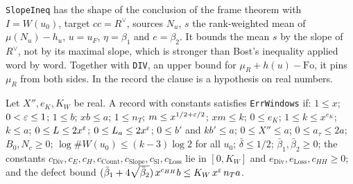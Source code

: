 \begin{remark}\label{geoa:rem-slopeineq}
\texttt{SlopeIneq} has the shape of the conclusion of the frame theorem with $I=W(u_0)$,
target $cc=R^{\vee}$, sources $N_u$, $s$ the rank-weighted mean of $\mu(N_u)-h_u$,
$u=u_F$, $\eta=\beta_1$ and $e=\beta_2$. It bounds the mean $s$ by the slope of
$R^{\vee}$, not by its maximal slope, which is stronger than Bost's inequality applied word
by word. Together with \texttt{DIV}, an upper bound for $\mu_R+h(u)-\mathrm{Fo}$, it
pins $\mu_R$ from both sides. In the record the clause is a hypothesis on real numbers.
\end{remark}

\begin{definition}\label{geoa:errwindows}
Let $X'',e_K,K_W$ be real. A record with constants satisfies \texttt{ErrWindows} if:
$1\le x$; $0<\varepsilon\le1$; $1\le b$; $xb\le a$; $1\le n_T$; $m\le x^{1/2+\varepsilon/2}$;
$xm\le k$; $0\le e_K$; $1\le k\le x^{e_K}$; $k\le a$; $0\le L\le2x^{\varepsilon}$;
$0\le L_a\le2x^{\varepsilon}$; $0\le b'$ and $kb'\le a$; $0\le X''\le a$; $0\le a_{\tau}\le2a$;
$B_0,N_c\ge0$; $\log\#W(u_0)\le(k-3)\log2$ for all $u_0$; $\bar\delta\le1/2$;
$\bar\beta_1,\bar\beta_2\ge0$; the constants $c_{\mathrm{Div}},c_E,c_H,c_{\mathrm{Count}},
c_{\mathrm{Slope}},c_{\mathrm{Sl}},c_{\mathrm{Loss}}$ lie in $[0,K_W]$ and
$e_{\mathrm{Div}},e_{\mathrm{Loss}},c_{HH}\ge0$; and the defect bound
$(\bar\beta_1+4\sqrt{\bar\beta_2})\,x^{c_{HH}}b\le K_W\,x^{\varepsilon}\,n_Ta$.
\end{definition}

